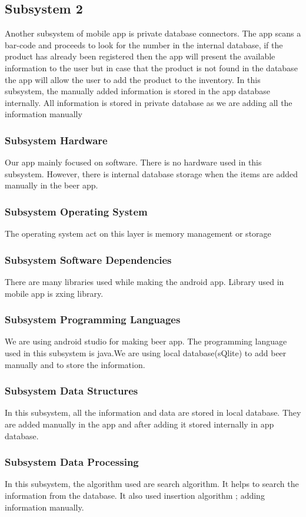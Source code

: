 \subsection{Subsystem 2}
Another subsystem of mobile app is private database connectors. The app scans a bar-code and proceeds to look for the number in the internal database, if the product has already been registered then the app will present the available information to the user but in case that the product is not found in the database the app will allow the user to add the product to the inventory. In this subsystem, the manually added information is stored in the app database internally. All information is stored in private database as we are adding all the information manually

\subsubsection{Subsystem Hardware}
Our app mainly focused on software. There is no hardware used in this subsystem. However, there is internal database storage when the items are added manually in the beer app. 

\subsubsection{Subsystem Operating System}
The operating system act on this layer is memory management or storage

\subsubsection{Subsystem Software Dependencies}
There are many libraries used while making the android app. Library used in mobile app is zxing library.

\subsubsection{Subsystem Programming Languages}
We are using android studio for making beer app. The programming language used in this subsystem is java.We are using local database(sQlite) to add beer manually and to store the information.

\subsubsection{Subsystem Data Structures}
In this subsystem, all the information and data are stored in local database. They are added manually in the app and after adding it stored internally in app database.

\subsubsection{Subsystem Data Processing}
In this subsystem, the algorithm used are search algorithm. It helps to search the information from the database. It also used insertion algorithm ; adding information manually.

